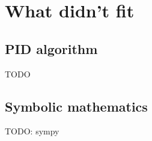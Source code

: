 \newpage
\section{What didn't fit}

\subsection{PID algorithm}
TODO

\subsection{Symbolic mathematics}
TODO: sympy